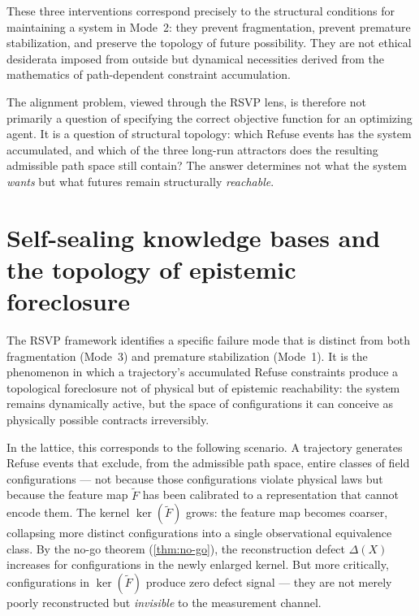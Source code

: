 \documentclass[12pt, oneside]{memoir}
\newcommand{\Ft}{\widetilde{F}}
\begin{document}
These three interventions correspond precisely to the structural conditions for
maintaining a system in Mode~2: they prevent fragmentation, prevent premature
stabilization, and preserve the topology of future possibility.  They are not ethical
desiderata imposed from outside but dynamical necessities derived from the mathematics
of path-dependent constraint accumulation.

\medskip
The alignment problem, viewed through the RSVP lens, is therefore not primarily a
question of specifying the correct objective function for an optimizing agent.  It is a
question of structural topology: which Refuse events has the system accumulated, and
which of the three long-run attractors does the resulting admissible path space still
contain?  The answer determines not what the system \emph{wants} but what futures remain
structurally \emph{reachable}.

\section{Self-sealing knowledge bases and the topology of epistemic foreclosure}
\label{sec:self-sealing}

The RSVP framework identifies a specific failure mode that is distinct from both
fragmentation (Mode~3) and premature stabilization (Mode~1).  It is the phenomenon in
which a trajectory's accumulated Refuse constraints produce a topological foreclosure not
of physical but of epistemic reachability: the system remains dynamically active, but the
space of configurations it can conceive as physically possible contracts irreversibly.

In the lattice, this corresponds to the following scenario.  A trajectory generates
Refuse events that exclude, from the admissible path space, entire classes of field
configurations — not because those configurations violate physical laws but because the
feature map $\Ft$ has been calibrated to a representation that cannot encode them.  The
kernel $\ker(\Ft)$ grows: the feature map becomes coarser, collapsing more distinct
configurations into a single observational equivalence class.  By the no-go theorem
(\cref{thm:no-go}), the reconstruction defect $\Delta(X)$ increases for configurations
in the newly enlarged kernel.  But more critically, configurations in $\ker(\Ft)$ produce
zero defect signal — they are not merely poorly reconstructed but \emph{invisible} to the
measurement channel.
\end{document}
